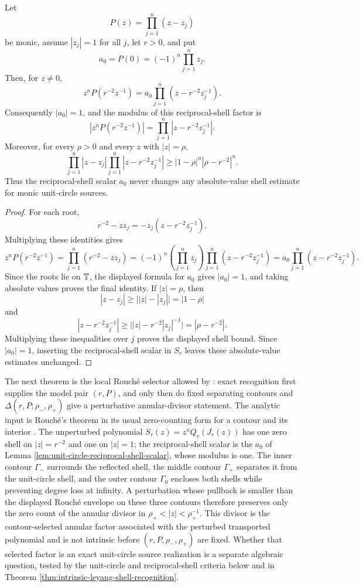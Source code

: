 \begin{lemma}\label{lem:unit-circle-reciprocal-shell-scalar}
Let
\[
P(z)=\prod_{j=1}^{n}(z-z_j)
\]
be monic, assume \(|z_j|=1\) for all \(j\), let \(r>0\), and put
\[
a_0=P(0)=(-1)^n\prod_{j=1}^{n}z_j .
\]
Then, for \(z\ne0\),
\[
z^nP(r^{-2}z^{-1})
=a_0\prod_{j=1}^{n}(z-r^{-2}z_j^{-1}).
\]
Consequently \(|a_0|=1\), and the modulus of this reciprocal-shell
factor is
\[
\left|z^nP(r^{-2}z^{-1})\right|
=\prod_{j=1}^{n}|z-r^{-2}z_j^{-1}|.
\]
Moreover, for every \(\rho>0\) and every \(z\) with \(|z|=\rho\),
\[
\prod_{j=1}^{n}|z-z_j|
\prod_{j=1}^{n}|z-r^{-2}z_j^{-1}|
\ge |1-\rho|^n|\rho-r^{-2}|^n .
\]
Thus the reciprocal-shell scalar \(a_0\) never changes any
absolute-value shell estimate for monic unit-circle sources.
\end{lemma}

\begin{proof}
For each root,
\[
r^{-2}-zz_j=-z_j(z-r^{-2}z_j^{-1}).
\]
Multiplying these identities gives
\[
z^nP(r^{-2}z^{-1})
=\prod_{j=1}^{n}(r^{-2}-zz_j)
=(-1)^n\left(\prod_{j=1}^{n}z_j\right)
\prod_{j=1}^{n}(z-r^{-2}z_j^{-1})
=a_0\prod_{j=1}^{n}(z-r^{-2}z_j^{-1}).
\]
Since the roots lie on \(\mathbb{T}\), the displayed formula for \(a_0\) gives
\(|a_0|=1\), and taking absolute values proves the final identity.
If \(|z|=\rho\), then
\[
|z-z_j|\ge \bigl||z|-|z_j|\bigr|=|1-\rho|
\]
and
\[
|z-r^{-2}z_j^{-1}|
\ge \bigl||z|-r^{-2}|z_j|^{-1}\bigr|
=|\rho-r^{-2}|.
\]
Multiplying these inequalities over \(j\) proves the displayed shell
bound.  Since \(|a_0|=1\), inserting the reciprocal-shell scalar in
\(S_r\) leaves these absolute-value estimates unchanged.
\end{proof}

The next theorem is the local Rouch\'e selector allowed by
: exact recognition first supplies
the model pair \((r,P)\), and only then do fixed separating contours and
\(\Delta(r,P;\rho_-,\rho_+)\) give a perturbative annular-divisor
statement.  The analytic input is Rouch\'e's theorem in its usual
zero-counting form for a contour and its interior
\citep[pp.~152--153]{Ahlfors1979}.  The unperturbed polynomial
\(S_r(z)=z^nQ_r(J_r(z))\) has one zero shell on \(|z|=r^{-2}\) and one on \(|z|=1\); the reciprocal-shell scalar is the \(a_0\) of Lemma \ref{lem:unit-circle-reciprocal-shell-scalar}, whose modulus is one.  The inner contour \(\Gamma_-\) surrounds the reflected shell, the middle contour \(\Gamma_+\) separates it from the unit-circle shell, and the outer contour \(\Gamma_0\) encloses both shells while preventing degree loss at infinity.  A perturbation whose pullback is smaller than the displayed Rouch\'e envelope on these three contours therefore preserves only the zero count of the annular divisor in \(\rho_+<|z|<\rho_+^{-1}\).  This divisor is the contour-selected annular factor associated with the perturbed transported polynomial and is not intrinsic before \((r,P,\rho_-,\rho_+)\) are fixed.  Whether that selected factor is an exact unit-circle source realization is a separate algebraic question, tested by the unit-circle and reciprocal-shell criteria below and in Theorem \ref{thm:intrinsic-leyang-shell-recognition}.

